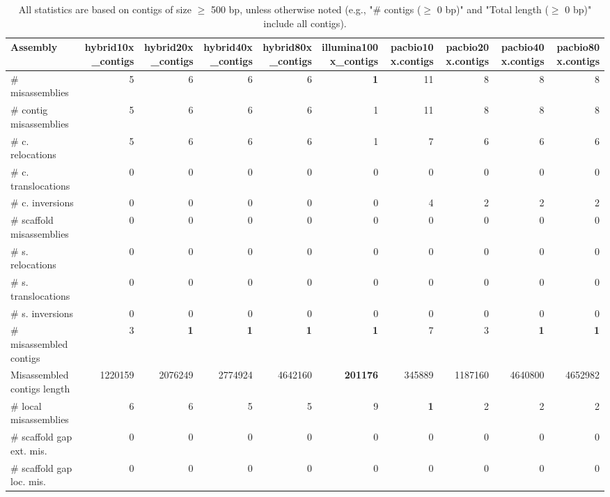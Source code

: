 \documentclass[12pt,a4paper]{article}
\begin{document}
\begin{table}[ht]
\begin{center}
\caption{All statistics are based on contigs of size $\geq$ 500 bp, unless otherwise noted (e.g., "\# contigs ($\geq$ 0 bp)" and "Total length ($\geq$ 0 bp)" include all contigs).}
\begin{tabular}{|l*{9}{|r}|}
\hline
Assembly & hybrid10x\_contigs & hybrid20x\_contigs & hybrid40x\_contigs & hybrid80x\_contigs & illumina100x\_contigs & pacbio10x.contigs & pacbio20x.contigs & pacbio40x.contigs & pacbio80x.contigs \\ \hline
\# misassemblies & 5 & 6 & 6 & 6 & {\bf 1} & 11 & 8 & 8 & 8 \\ \hline
\hspace{2mm}\# contig misassemblies & 5 & 6 & 6 & 6 & 1 & 11 & 8 & 8 & 8 \\ \hline
\hspace{5mm}\# c. relocations & 5 & 6 & 6 & 6 & 1 & 7 & 6 & 6 & 6 \\ \hline
\hspace{5mm}\# c. translocations & 0 & 0 & 0 & 0 & 0 & 0 & 0 & 0 & 0 \\ \hline
\hspace{5mm}\# c. inversions & 0 & 0 & 0 & 0 & 0 & 4 & 2 & 2 & 2 \\ \hline
\hspace{2mm}\# scaffold misassemblies & 0 & 0 & 0 & 0 & 0 & 0 & 0 & 0 & 0 \\ \hline
\hspace{5mm}\# s. relocations & 0 & 0 & 0 & 0 & 0 & 0 & 0 & 0 & 0 \\ \hline
\hspace{5mm}\# s. translocations & 0 & 0 & 0 & 0 & 0 & 0 & 0 & 0 & 0 \\ \hline
\hspace{5mm}\# s. inversions & 0 & 0 & 0 & 0 & 0 & 0 & 0 & 0 & 0 \\ \hline
\# misassembled contigs & 3 & {\bf 1} & {\bf 1} & {\bf 1} & {\bf 1} & 7 & 3 & {\bf 1} & {\bf 1} \\ \hline
Misassembled contigs length & 1220159 & 2076249 & 2774924 & 4642160 & {\bf 201176} & 345889 & 1187160 & 4640800 & 4652982 \\ \hline
\# local misassemblies & 6 & 6 & 5 & 5 & 9 & {\bf 1} & 2 & 2 & 2 \\ \hline
\# scaffold gap ext. mis. & 0 & 0 & 0 & 0 & 0 & 0 & 0 & 0 & 0 \\ \hline
\# scaffold gap loc. mis. & 0 & 0 & 0 & 0 & 0 & 0 & 0 & 0 & 0 \\ \hline

\end{tabular}
\end{center}
\end{table}
\end{document}
